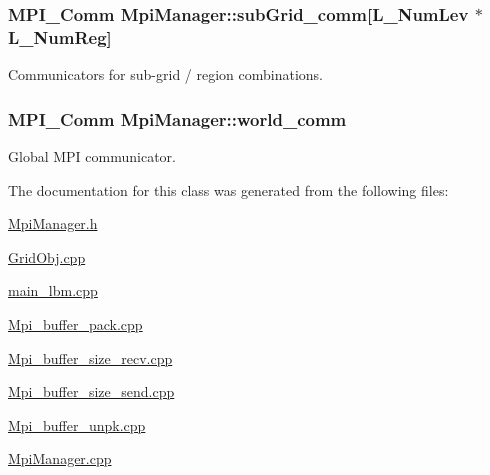 \subsubsection[{\texorpdfstring{sub\+Grid\+\_\+comm}{subGrid_comm}}]{\setlength{\rightskip}{0pt plus 5cm}M\+P\+I\+\_\+\+Comm Mpi\+Manager\+::sub\+Grid\+\_\+comm\mbox{[}{\bf L\+\_\+\+Num\+Lev} $\ast${\bf L\+\_\+\+Num\+Reg}\mbox{]}}\hypertarget{class_mpi_manager_a1c65695e5dd2cca3ccb76e83715226f8}{}\label{class_mpi_manager_a1c65695e5dd2cca3ccb76e83715226f8}


Communicators for sub-\/grid / region combinations. 

\subsubsection[{\texorpdfstring{world\+\_\+comm}{world_comm}}]{\setlength{\rightskip}{0pt plus 5cm}M\+P\+I\+\_\+\+Comm Mpi\+Manager\+::world\+\_\+comm}\hypertarget{class_mpi_manager_aec1ed834d1a8fa19f87499fb0d5cd332}{}\label{class_mpi_manager_aec1ed834d1a8fa19f87499fb0d5cd332}


Global M\+PI communicator. 



The documentation for this class was generated from the following files\+:\begin{DoxyCompactItemize}
\item 
\hyperlink{_mpi_manager_8h}{Mpi\+Manager.\+h}\item 
\hyperlink{_grid_obj_8cpp}{Grid\+Obj.\+cpp}\item 
\hyperlink{main__lbm_8cpp}{main\+\_\+lbm.\+cpp}\item 
\hyperlink{_mpi__buffer__pack_8cpp}{Mpi\+\_\+buffer\+\_\+pack.\+cpp}\item 
\hyperlink{_mpi__buffer__size__recv_8cpp}{Mpi\+\_\+buffer\+\_\+size\+\_\+recv.\+cpp}\item 
\hyperlink{_mpi__buffer__size__send_8cpp}{Mpi\+\_\+buffer\+\_\+size\+\_\+send.\+cpp}\item 
\hyperlink{_mpi__buffer__unpk_8cpp}{Mpi\+\_\+buffer\+\_\+unpk.\+cpp}\item 
\hyperlink{_mpi_manager_8cpp}{Mpi\+Manager.\+cpp}\end{DoxyCompactItemize}
